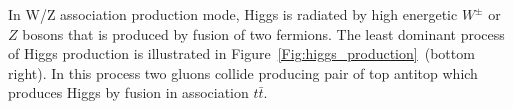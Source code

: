 In W/Z association production mode, 
Higgs is radiated by high energetic $W^\pm$ or $Z$ bosons that is produced by fusion of two fermions. 
The least dominant process of Higgs production is illustrated in Figure~\ref{Fig:higgs_production}~(bottom right). In this process two gluons
collide producing pair of top antitop which produces Higgs by fusion in association $t\bar{t}$. 

